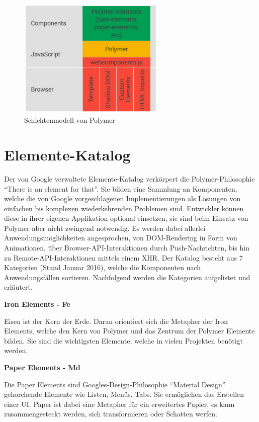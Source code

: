 \begin{figure}[h]
 \centering
 \includegraphics[width=7cm,keepaspectratio]{kapitel3/bilder/1-architektur}
 \caption{Schichtenmodell von Polymer}
 \label{fig:schimopo}
\end{figure}



\section{Elemente-Katalog}\label{elemente-katalog}

Der von Google verwaltete Elemente-Katalog verkörpert die Polymer-Philosophie ``There is an element for that''. Sie bilden eine Sammlung an Komponenten, welche die von Google vorgeschlagenen Implementierungen als Lösungen von einfachen bis komplexen wiederkehrenden Problemen sind. Entwickler können diese in ihrer eigenen Applikation optional einsetzen, sie sind beim Einsatz von Polymer aber nicht zwingend notwendig. Es werden dabei allerlei Anwendungsmöglichkeiten angesprochen, von \ac{DOM}-Rendering in Form von Animationen, über Browser-\ac{API}-Interaktionen durch Push-Nachrichten, bis hin zu Remote-\ac{API}-Interaktionen mittels einem \ac{XHR}. Der Katalog besteht aus 7 Kategorien (Stand Januar 2016), welche die Komponenten nach Anwendungsfällen sortieren. Nachfolgend werden die Kategorien aufgelistet und erläutert.


\textbf{Iron Elements - Fe}

Eisen ist der Kern der Erde. Daran orientiert sich die Metapher der Iron Elements, welche den Kern von Polymer und das Zentrum der Polymer Elemente bilden. Sie sind die wichtigsten Elemente, welche in vielen Projekten benötigt werden.

\textbf{Paper Elements - Md}

Die Paper Elements sind Googles-Design-Philosophie ``Material Design'' gehorchende Elemente wie Listen, Menüs, Tabs. Sie ermöglichen das Erstellen einer \ac{UI}. Paper ist dabei eine Metapher für ein erweitertes Papier, es kann zusammengesteckt werden, sich transformieren oder Schatten werfen.

